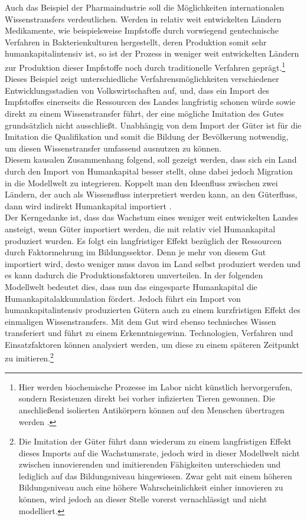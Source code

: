 Auch das Beispiel der Pharmaindustrie soll die Möglichkeiten internationalen Wissenstransfers verdeutlichen. Werden in relativ weit entwickelten Ländern Medikamente, wie beispielsweise Impfstoffe durch vorwiegend gentechnische Verfahren in Bakterienkulturen hergestellt, deren Produktion somit sehr humankapitalintensiv ist, so ist der Prozess in weniger weit entwickelten Ländern zur Produktion dieser Impfstoffe noch durch traditionelle Verfahren geprägt.\footnote{Hier werden biochemische Prozesse im Labor nicht künstlich hervorgerufen, sondern Resistenzen direkt bei vorher infizierten Tieren gewonnen. Die anschließend isolierten Antikörpern können auf den Menschen übertragen werden \cite{Aberle.2010}.} Dieses Beispiel zeigt unterschiedliche Verfahrensmöglichkeiten verschiedener Entwicklungsstadien von Volkswirtschaften auf, und, dass ein Import des Impfstoffes einerseits die Ressourcen des Landes langfristig schonen würde sowie direkt zu einem Wissenstransfer führt, der eine mögliche Imitation des Gutes grundsätzlich nicht ausschließt. Unabhängig von dem Import der Güter ist für die Imitation die Qualifikation und somit die Bildung der Bevölkerung notwendig, um diesen Wissenstransfer umfassend ausnutzen zu können. \\
%
Diesem kausalen Zusammenhang folgend, soll gezeigt werden, dass sich ein Land durch den Import von Humankapital besser stellt,  ohne dabei jedoch Migration in die Modellwelt zu integrieren. Koppelt man den Ideenfluss zwischen zwei Ländern, der auch als Wissensfluss interpretiert werden kann, an den Güterfluss, dann wird indirekt Humankapital importiert \cite{RiveraBatiz.1991a}.\\
%
Der Kerngedanke ist, dass das Wachstum eines weniger weit entwickelten Landes ansteigt, wenn Güter importiert werden, die mit relativ viel Humankapital produziert wurden. Es folgt ein langfristiger Effekt bezüglich der Ressourcen durch Faktormehrung im Bildungssektor. Denn je mehr von diesem Gut importiert wird, desto weniger muss davon im Land selbst produziert werden und es kann dadurch die Produktionsfaktoren umverteilen. In der folgenden Modellwelt bedeutet dies, dass nun das eingesparte Humankapital die Humankapitalakkumulation fördert. Jedoch führt ein Import von humankapitalintensiv produzierten Gütern auch zu einem kurzfristigen Effekt des einmaligen Wissenstransfers. Mit dem Gut wird ebenso technisches Wissen transferiert und führt zu einem Erkenntnisgewinn. Technologien, Verfahren und Einsatzfaktoren können analysiert werden, um diese zu einem späteren Zeitpunkt zu imitieren.\footnote{Die Imitation der Güter führt dann wiederum zu einem langfristigen Effekt dieses Imports auf die Wachstumsrate, jedoch wird in dieser Modellwelt nicht zwischen innovierenden und imitierenden Fähigkeiten unterschieden und lediglich auf das Bildungsniveau hingewiesen. Zwar geht mit einem höheren Bildungsniveau auch eine höhere Wahrscheinlichkeit einher innovieren zu können, wird jedoch an dieser Stelle vorerst vernachlässigt und nicht modelliert.}
